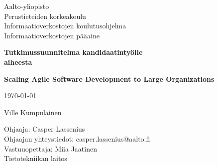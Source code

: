 \begin{titlepage}

  \begin{flushleft}
  \begin{minipage}{15cm}
	  \linespread{1.0}\small
	  Aalto-yliopisto \\
	  Perustieteiden korkeakoulu \\
	  Informaatioverkostojen koulutusohjelma \\
	  Informaatioverkostojen pääaine
	  \par
  \end{minipage}
  \end{flushleft}
  \centering
  \vspace{1.5cm}
  {\large\bfseries Tutkimussuunnitelma kandidaatintyölle \\ aiheesta \par}
  {\LARGE\bfseries Scaling Agile Software Development to Large Organizations\par}
  \vspace{1.5cm}
  {\large \today\par}
  {\Large Ville Kumpulainen \par}
  \vfill

  \begin{flushleft}
  \begin{minipage}{15cm}
	  \linespread{1.0}\small
	  Ohjaaja: Casper Lassenius \\
	  Ohjaajan yhteystiedot: casper.lassenius@aalto.fi \\
	  Vastuuopettaja: Miia Jaatinen \\
	  Tietotekniikan laitos
	  \par
  \end{minipage}
  \end{flushleft}


\end{titlepage}
